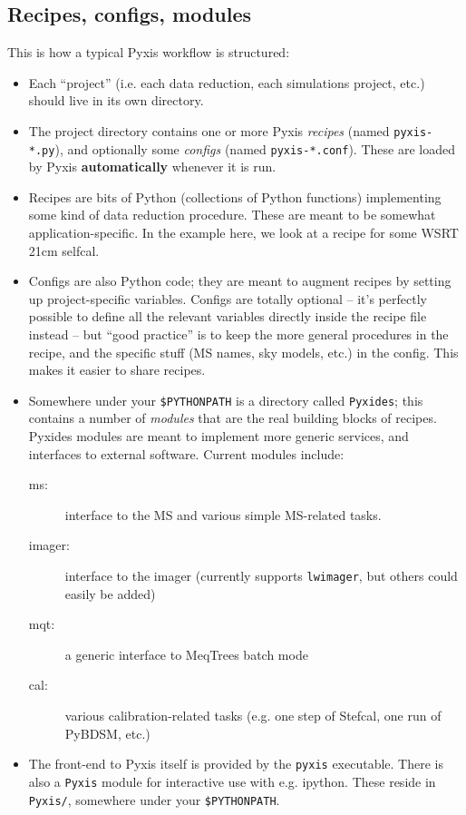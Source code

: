 \documentclass[a4paper,10pt]{article}
\begin{document}
\subsection{Recipes, configs, modules} 

This is how a typical Pyxis workflow is structured:

\begin{itemize}
  \item Each ``project'' (i.e. each data reduction, each simulations project, etc.) should live in its own directory.
  
  \item The project directory contains one or more Pyxis {\em recipes} (named {\tt pyxis-*.py}), and 
  optionally some {\em configs} (named {\tt pyxis-*.conf}). These are loaded by Pyxis {\bf automatically} whenever it is run.
  
  \item Recipes are bits of Python (collections of Python functions) implementing some kind of data reduction procedure. These are meant to be somewhat application-specific. In the example here, we look at a recipe for some WSRT 21cm selfcal.
  
  \item Configs are also Python code; they are meant to augment recipes by setting up project-specific variables. Configs are totally optional -- it's perfectly possible to define all the relevant variables directly inside the recipe file instead -- but ``good practice'' is to keep the more general procedures in the recipe, and the specific stuff (MS names, sky models, etc.) in the config. This makes it easier to share recipes.

  \item Somewhere under your {\tt \$PYTHONPATH} is a directory called {\tt Pyxides}; this contains a number of {\em modules} 
  that are the real building blocks of recipes. Pyxides modules are meant to implement more generic services, and interfaces to external software. Current modules include:

  \begin{description}
    \item[ms:] interface to the MS and various simple MS-related tasks.
    \item[imager:] interface to the imager (currently supports {\tt lwimager}, but others could easily be added)  
    \item[mqt:] a generic interface to MeqTrees batch mode
    \item[cal:] various calibration-related tasks (e.g. one step of Stefcal, one run of PyBDSM, etc.)
\end{description}
  
  \item The front-end to Pyxis itself is provided by the {\tt pyxis} executable. There is also a 
  {\tt Pyxis} module for interactive use with e.g. ipython. These reside in {\tt Pyxis/}, 
  somewhere under your {\tt \$PYTHONPATH}.

\end{itemize}
\end{document}
